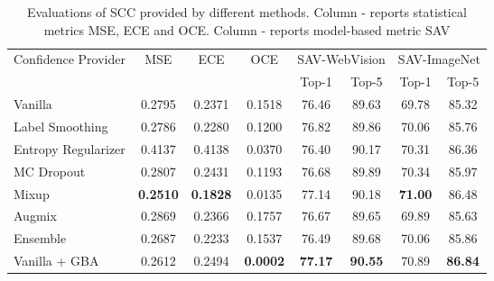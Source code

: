 \documentclass[runningheads]{llncs}
\begin{document}
\begin{table*}[t]
	\centering
	\caption{Evaluations of SCC provided by different methods. Column - reports statistical metrics MSE, ECE and OCE. Column - reports model-based metric SAV}
	\smallskip
	\begin{tabular}{lccc@{\hskip 5pt}cccc}
		\toprule
		\multirow{2}{*}{Confidence Provider} & \multicolumn{1}{c}{\multirow{2}{*}{MSE}} & \multicolumn{1}{c}{\multirow{2}{*}{ECE}} & \multicolumn{1}{c}{\multirow{2}{*}{OCE}} & \multicolumn{2}{c}{SAV-WebVision} & \multicolumn{2}{c}{SAV-ImageNet}\\
		& \multicolumn{1}{c}{} & \multicolumn{1}{c}{} & \multicolumn{1}{c}{} & \multicolumn{1}{c}{Top-1} & \multicolumn{1}{c}{Top-5} & \multicolumn{1}{c}{Top-1} & \multicolumn{1}{c}{Top-5}\\ 
		\midrule
		Vanilla 						& 0.2795 & 0.2371 & 0.1518 & 76.46 & 89.63 & 69.78 & 85.32 \\ 
		Label Smoothing  		 & 0.2786 & 0.2280 & 0.1200 & 76.82 & 89.86 & 70.06 & 85.76 \\ 
		Entropy Regularizer 	& 0.4137 & 0.4138 & 0.0370 & 76.40 & 90.17 & 70.31 & 86.36 \\ 
		MC Dropout  & 0.2807 & 0.2431 & 0.1193 & 76.68 & 89.89 & 70.34 & 85.97 \\ 
		Mixup   & \textbf{0.2510} & \textbf{0.1828} & 0.0135 & 77.14 & 90.18 & \textbf{71.00} & 86.48 \\
		Augmix	  					& 0.2869 & 0.2366 & 0.1757  & 76.67 & 89.65 & 69.89 & 85.63  \\ 
		Ensemble  	  & 0.2687 & 0.2233 & 0.1537  & 76.49 & 89.68 & 70.06 & 85.86  \\ 
		Vanilla + GBA 	  & 0.2612 & 0.2494 & \textbf{0.0002}  & \textbf{77.17} & \textbf{90.55} & 70.89 & \textbf{86.84} \\ 
		\bottomrule
	\end{tabular}
	\label{tab:comparison}
\end{table*}
\end{document}
